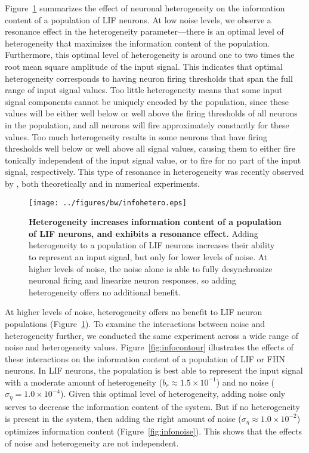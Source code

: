 \documentclass[12pt]{article}
\begin{document}
Figure~\ref{fig:infohetero} summarizes the effect of neuronal heterogeneity on the information content of a population of LIF neurons. At low noise levels, we observe a resonance effect in the heterogeneity parameter---there is an optimal level of heterogeneity that maximizes the information content of the population. Furthermore, this optimal level of heterogeneity is around one to two times the root mean square amplitude of the input signal. This indicates that optimal heterogeneity corresponds to having neuron firing thresholds that span the full range of input signal values. Too little heterogeneity means that some input signal components cannot be uniquely encoded by the population, since these values will be either well below or well above the firing thresholds of all neurons in the population, and all neurons will fire approximately constantly for these values. Too much heterogeneity results in some neurons that have firing thresholds well below or well above all signal values, causing them to either fire tonically independent of the input signal value, or to fire for no part of the input signal, respectively. This type of resonance in heterogeneity was recently observed by \cite{Mejias2012}, both theoretically and in numerical experiments.

\begin{figure}
  \ifx\hidefigures\undefined
    \centering
    \texttt{[image: ../figures/bw/infohetero.eps]}
  \fi
  \caption{
    \textbf{Heterogeneity increases information content of a population of LIF neurons, and exhibits a resonance effect.}
    Adding heterogeneity to a population of LIF neurons increases their ability to represent an input signal, but only for lower levels of noise. At higher levels of noise, the noise alone is able to fully desynchronize neuronal firing and linearize neuron responses, so adding heterogeneity offers no additional benefit.
  }
  \label{fig:infohetero}
\end{figure}

At higher levels of noise, heterogeneity offers no benefit to LIF neuron populations (Figure~\ref{fig:infohetero}). To examine the interactions between noise and heterogeneity further, we conducted the same experiment across a wide range of noise and heterogeneity values. Figure~\ref{fig:infocontour} illustrates the effects of these interactions on the information content of a population of LIF or FHN neurons. In LIF neurons, the population is best able to represent the input signal with a moderate amount of heterogeneity ($b_r \approx 1.5 \times 10^{-1}$) and no noise ($\sigma_\eta = 1.0 \times 10^{-4}$). Given this optimal level of heterogeneity, adding noise only serves to decrease the information content of the system. But if no heterogeneity is present in the system, then adding the right amount of noise ($\sigma_\eta \approx 1.0 \times 10^{-2}$) optimizes information content (Figure~\ref{fig:infonoise}). This shows that the effects of noise and heterogeneity are not independent.
\end{document}
